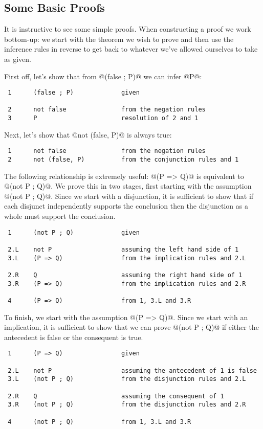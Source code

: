 \subsection{Some Basic Proofs}

It is instructive to see some simple proofs.  When constructing a proof
we work bottom-up: we start with the theorem we wish to prove and then
use the inference rules in reverse to get back to whatever we've allowed
ourselves to take as given.

First off, let's show that from @(false ; P)@ we can infer @P@:
\begin{verbatim}
 1      (false ; P)             given

 2      not false               from the negation rules
 3      P                       resolution of 2 and 1
\end{verbatim}

Next, let's show that @not (false, P)@ is always true:
\begin{verbatim}
 1      not false               from the negation rules
 2      not (false, P)          from the conjunction rules and 1
\end{verbatim}

The following relationship is extremely useful: @(P => Q)@ is equivalent
to @(not P ; Q)@.  We prove this in two stages, first starting with the
assumption @(not P ; Q)@.
Since we start with a disjunction, it is sufficient to show that if each
disjunct independently supports the conclusion then the disjunction as a
whole must support the conclusion.
\begin{verbatim}
 1      (not P ; Q)             given

 2.L    not P                   assuming the left hand side of 1
 3.L    (P => Q)                from the implication rules and 2.L

 2.R    Q                       assuming the right hand side of 1
 3.R    (P => Q)                from the implication rules and 2.R

 4      (P => Q)                from 1, 3.L and 3.R
\end{verbatim}
To finish, we start with the assumption @(P => Q)@.  Since we start with
an implication, it is sufficient to show that we can prove @(not P ; Q)@
if either the antecedent is false or the consequent is true.
\begin{verbatim}
 1      (P => Q)                given

 2.L    not P                   assuming the antecedent of 1 is false
 3.L    (not P ; Q)             from the disjunction rules and 2.L

 2.R    Q                       assuming the consequent of 1
 3.R    (not P ; Q)             from the disjunction rules and 2.R

 4      (not P ; Q)             from 1, 3.L and 3.R
\end{verbatim}

